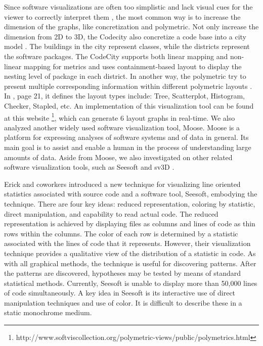 \documentclass{sig-alternate}
\begin{document}
Since software visualizations are often too simplistic and lack visual cues for the viewer to correctly interpret them \cite{petre1995looking},
the most common way is to increase the dimension of the graphs, like concretization and polymetric.
Not only increase the dimension from 2D to 3D, the Codecity also concretize a code base into a city model \cite{wettel2008codecity}.
The buildings in the city represent classes, while the districts represent the software packages.
The CodeCity supports both linear mapping and non-linear mapping for metrics and uses containment-based layout to
display the nesting level of package in each district. In another way, the polymetric try
to present multiple corresponding information within different polymetric layouts \cite{lanza2003polymetric, lanza2005codecrawler, lanza2003object}.
In \cite{lanza2003object}, page 21, it defines the layout types include: Tree, Scatterplot, Histogram, Checker, Stapled, etc.
An implementation of this visualization tool can be found at this website \footnote{http://www.softviscollection.org/polymetric-views/public/polymetrics.html},
which can generate 6 layout graphs in real-time.
We also analyzed another widely used software visualization tool, Moose. Moose is a platform for expressing analyses of software systems and of data in general. Its main goal is to assist and enable a human in the process of understanding large amounts of data.
Aside from Moose, we also investigated on other related software visualization tools, such as Seesoft \cite{eick1992seesoft} and sv3D \cite{maletic2003source}.

Erick and coworkers introduced a new technique for visualizing line oriented statistics associated with source code and a software tool, Seesoft, embodying the technique. There are four key ideas: reduced representation, coloring by statistic, direct manipulation, and capability to read actual code. The reduced representation is achieved by displaying files as columns and lines of code as thin rows within the columns. The color of each row is determined by a statistic associated with the lines of code that it represents. However, their visualization technique provides a qualitative view of the distribution of a statistic in code. As with all graphical methods, the technique is useful for discovering patterns. After the patterns are discovered, hypotheses may be tested by means of standard statistical methods. Currently, Seesoft is unable to display more than 50,000 lines of code simultaneously. A key idea in Seesoft is its interactive use of direct manipulation techniques and use of color. It is difficult to describe these in a static monochrome medium. 
\end{document}
